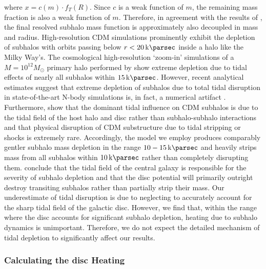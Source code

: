 \documentclass[usenatbib]{mnras}
\begin{document}
where $x = c(m) \cdot f_T(R)$. Since $c$ is a weak function of $m$, the remaining mass fraction is also a weak function of $m$. Therefore, in agreement with the results of \citet{unified_model}, the final resolved subhalo mass function is approximately also decoupled in mass and radius. High-resolution CDM simulations prominently exhibit the depletion of subhalos with orbits passing below $r < \SI{20}{\kilo \parsec}$ inside a halo like the Milky Way's. The cosmological high-resolution `zoom-in' simulations of a $M = 10^{12} M_{\odot}$ primary halo performed by \cite{subhalo_truncation_sims} show extreme depletion due to tidal effects of nearly all subhalos within $\SI{15}{\kilo\parsec}$. However, recent analytical estimates suggest that extreme depletion of subhalos due to total tidal disruption in state-of-the-art N-body simulations is, in fact, a numerical artifact \citep{dark_matter_substructure_numerics}. Furthermore, \cite{disruption_numerics} show that the dominant tidal influence on CDM subhalos is due to the tidal field of the host halo and disc rather than subhalo-subhalo interactions and that physical disruption of CDM substructure due to tidal stripping or shocks is extremely rare. Accordingly, the model we employ produces comparably gentler subhalo mass depletion in the range $10 - \SI{15}{\kilo \parsec}$ and heavily strips mass from all subhalos within $\SI{10}{\kilo\parsec}$ rather than completely disrupting them. \cite{subhalo_truncation_sims} conclude that the tidal field of the central galaxy is responsible for the severity of subhalo depletion and that the disc potential will primarily outright destroy transiting subhalos rather than partially strip their mass. Our underestimate of tidal disruption is due to neglecting to accurately account for the sharp tidal field of the galactic disc. However, we find that, within the range where the disc accounts for significant subhalo depletion, heating due to subhalo dynamics is unimportant. Therefore, we do not expect the detailed mechanism of tidal depletion to significantly affect our results. 

\subsubsection{Calculating the disc Heating}
\end{document}
